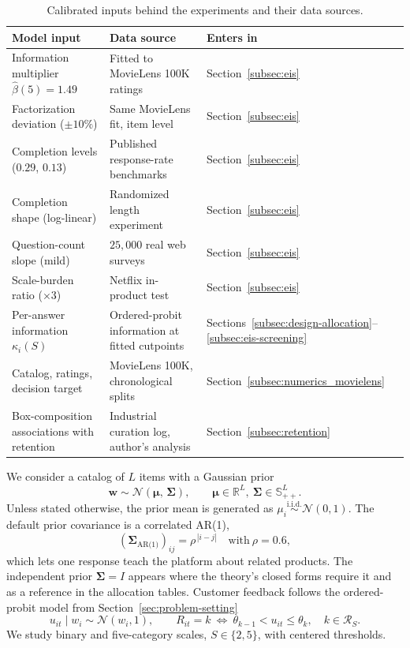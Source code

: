 \documentclass[11pt]{article}
\theoremstyle{definition}
\theoremstyle{remark}
\newcommand{\1}{\mathbf{1}}
\newcommand{\w}{\mathbf{w}}
\newcommand{\cR}{\mathcal{R}}
\begin{document}
\begin{table}[h!]
\centering
\scriptsize
\setlength{\tabcolsep}{5pt}
\begin{tabular}{lll}
\toprule
Model input & Data source & Enters in \\
\midrule
Information multiplier \(\hat\beta(5)=1.49\) & Fitted to MovieLens 100K ratings & Section~\ref{subsec:eis} \\
Factorization deviation (\(\pm 10\%\)) & Same MovieLens fit, item level & Section~\ref{subsec:eis} \\
Completion levels (\(0.29\), \(0.13\)) & Published response-rate benchmarks & Section~\ref{subsec:eis} \\
Completion shape (log-linear) & Randomized length experiment & Section~\ref{subsec:eis} \\
Question-count slope (mild) & \(25{,}000\) real web surveys & Section~\ref{subsec:eis} \\
Scale-burden ratio (\(\times 3\)) & Netflix in-product test & Section~\ref{subsec:eis} \\
Per-answer information \(\kappa_i(S)\) & Ordered-probit information at fitted cutpoints & Sections~\ref{subsec:design-allocation}--\ref{subsec:eis-screening} \\
Catalog, ratings, decision target & MovieLens 100K, chronological splits & Section~\ref{subsec:numerics_movielens} \\
Box-composition associations with retention & Industrial curation log, author's analysis & Section~\ref{subsec:retention} \\
\bottomrule
\end{tabular}
\caption{Calibrated inputs behind the experiments and their data sources.}
\label{tab:calibration-sources}
\end{table}

We consider a catalog of $L$ items with a Gaussian prior
\[
\w \sim \mathcal{N}(\boldsymbol{\mu},\,\boldsymbol{\Sigma}),\qquad
\boldsymbol{\mu}\in\mathbb{R}^L,\ \boldsymbol{\Sigma}\in\mathbb{S}_{++}^L.
\]
Unless stated otherwise, the prior mean is generated as $\mu_i\stackrel{\text{i.i.d.}}{\sim}\mathcal{N}(0,1)$. The default prior covariance is a correlated AR(1),
\[
(\boldsymbol{\Sigma}_{\text{AR(1)}})_{ij}=\rho^{\,|i-j|}\quad\text{with}\ \rho=0.6,
\]
which lets one response teach the platform about related products. The independent prior $\boldsymbol{\Sigma}=I$ appears where the theory's
closed forms require it and as a reference in the allocation tables. Customer feedback follows the ordered-probit model from Section~\ref{sec:problem-setting}
\[
u_{it}\mid w_i\sim\mathcal N(w_i,1),\qquad
R_{it}=k\ \Longleftrightarrow\ \theta_{k-1}<u_{it}\le \theta_k,\quad
k\in\cR_S.
\]
We study binary and five-category scales, \(S\in\{2,5\}\), with
centered thresholds.
\end{document}
